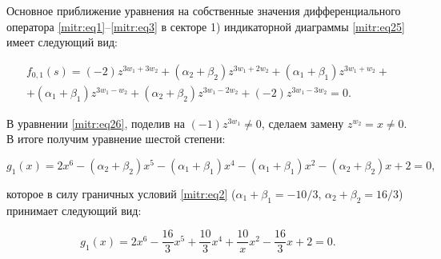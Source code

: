 \begin{lemma}[4]Основное приближение уравнения на собственные значения дифференциального оператора \eqref{mitr:eq1}--\eqref{mitr:eq3} в секторе {\rm 1)} индикаторной диаграммы \eqref{mitr:eq25} имеет следующий вид\/{\rm:}

\begin{multline}

\label{mitr:eq26}

f_{0,1}(s)=(-2)z^{3w_1+3w_2}

+(\alpha_2+\beta_2)z^{3w_1+2w_2}

+(\alpha_1+\beta_1)z^{3w_1+w_2}+\\

+(\alpha_1+\beta_1)z^{3w_1-w_2}

+(\alpha_2+\beta_2)z^{3w_1-2w_2}

+(-2)z^{3w_1-3w_2}=0.

\end{multline}

\end{lemma}



\smallskip



В уравнении \eqref{mitr:eq26}, поделив  на $(-1) z^{3w_1}\ne0$, сделаем замену $z^{w_2}=x\ne0$. В итоге получим уравнение шестой степени:

\begin{equation*}

g_1(x)=2x^6-(\alpha_2+\beta_2)x^5

-(\alpha_1+\beta_1) x^4-

(\alpha_1+\beta_1)x^2-

(\alpha_2+\beta_2)x+2=0,

\end{equation*}

которое  в силу граничных условий \eqref{mitr:eq2} ($\alpha_1+\beta_1=-{10}/3$, $\alpha_2+\beta_2={16}/3$) принимает следующий вид:

\begin{equation}

\label{mitr:eq27}

g_1(x)=2x^6-\frac{16}3x^5

+\frac{10}3

 x^4+ \frac{10}x

x^2-\frac{16}3

x+2=0.

\end{equation}


